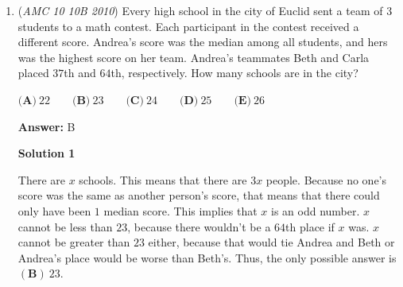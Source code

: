 \begin{enumerate}
 Now we turn to the triangle. Since it is equilateral, we can use the formula for the \href{https://artofproblemsolving.com/wiki/index.php?title=Area\_of\_an\_equilateral\_triangle}{area of an equilateral triangle} which is

 
 \[\frac{s^2\sqrt{3}}{4} = \frac{\frac13 \sqrt{3}}{4} = \frac{\sqrt{3}}{12}\]

 Putting it together, we get the answer to be $4\cdot\left( \frac{\pi}{18}-\frac{\sqrt{3}}{12} \right)= \boxed{\textbf{(B)}\ \frac{2\pi}{9}-\frac{\sqrt{3}}{3}}$




\textbf{Solution 2 (Answer Choices)}

At once, we can eliminate $(C)$, $(D)$, and $(E)$ because the answer should be $a \times \pi + b$, where $a$ and $b$ are real numbers (not necessarily rational) not equal to $0$. Now, all that's left is $\frac{\pi}{3}-1$ and $\frac{2 \pi}{9} - \frac{\sqrt{3}}{3}$. $\frac{\pi}{3}-1$ is simply the area of the circle minus the square, which is definitely wrong, so the answer is $\boxed{\textbf{(B)} \frac{2 \pi}{9} - \frac{\sqrt{3}}{3}}$



	\item (\textit{AMC 10 10B 2010}) Every high school in the city of Euclid sent a team of $3$ students to a math contest. Each participant in the contest received a different score. Andrea's score was the median among all students, and hers was the highest score on her team. Andrea's teammates Beth and Carla placed $37$th and $64$th, respectively. How many schools are in the city?


 $\textbf{(A)}\ 22 \qquad \textbf{(B)}\ 23 \qquad \textbf{(C)}\ 24 \qquad \textbf{(D)}\ 25 \qquad \textbf{(E)}\ 26$

 \textbf{Answer: }B



\textbf{Solution 1}

There are $x$ schools. This means that there are $3x$ people. Because no one's score was the same as another person's score, that means that there could only have been $1$ median score. This implies that $x$ is an odd number. $x$ cannot be less than $23$, because there wouldn't be a $64$th place if $x$ was. $x$ cannot be greater than $23$ either, because that would tie Andrea and Beth or Andrea's place would be worse than Beth's. Thus, the only possible answer is $\boxed{\mathbf{(B)}\ 23}$.

 




\end{enumerate}
